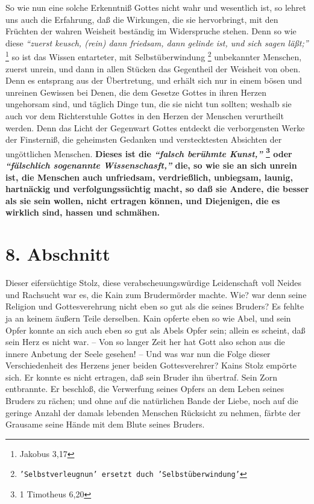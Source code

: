 So wie nun eine solche Erkenntniß Gottes nicht wahr und wesentlich ist, so
lehret uns auch die Erfahrung, daß die Wirkungen, die sie hervorbringt, mit den
Früchten der wahren Weisheit beständig im Widerspruche stehen. Denn so wie diese
\textit{"`zuerst keusch, (rein) dann friedsam, dann gelinde ist, und sich sagen
läßt;"'}
\footnote{Jakobus 3,17}
so ist das Wissen entarteter, mit Selbstüberwindung \footnote{\texttt{'Selbstverleugnun' ersetzt duch 'Selbstüberwindung'}}
unbekannter Menschen, zuerst unrein, und dann in allen Stücken das Gegentheil
der Weisheit von oben. Denn es entsprang aus der Übertretung, und erhält sich
nur in einem bösen und unreinen Gewissen bei Denen, die dem Gesetze Gottes in
ihren Herzen ungehorsam sind, und täglich Dinge tun, die sie nicht tun
sollten; weshalb sie auch vor dem Richterstuhle Gottes in den Herzen der
Menschen verurtheilt werden. Denn das Licht der Gegenwart Gottes entdeckt die
verborgensten Werke der Finsterniß, die geheimsten Gedanken  und verstecktesten
Absichten der ungöttlichen Menschen. \textbf{Dieses ist die
\textit{"`falsch berühmte Kunst,"'}
\footnote{1 Timotheus 6,20}
oder  \textit{"`fälschlich sogenannte Wissenschasft,"'}
die, so wie sie an sich unrein  ist, die Menschen auch unfriedsam, verdrießlich,
unbiegsam, launig, hartnäckig und verfolgungssüchtig macht, so daß sie Andere,
die besser als sie sein wollen, nicht ertragen können, und Diejenigen, die es
wirklich sind, hassen und schmähen.}

\section{8. Abschnitt} \label{kap7_ab8}

Dieser eifersüchtige Stolz, diese verabscheuungswürdige Leidenschaft voll Neides
und Rachsucht war es, die Kain  zum Brudermörder  machte. Wie? war denn seine
Religion und Gottesverehrung nicht eben so gut als die seines Bruders? Es fehlte
ja an keinem äußern Teile derselben. Kain  opferte eben so wie Abel, und sein
Opfer konnte an sich auch eben so gut als Abels Opfer sein; allein es scheint,
daß sein Herz es nicht war. -- Von so langer Zeit her hat Gott also schon aus
die innere Anbetung der Seele gesehen! -- Und was war nun die Folge dieser
Verschiedenheit des Herzens jener beiden Gottesverehrer? Kains Stolz empörte
sich. Er konnte es nicht ertragen, daß sein Bruder ihn übertraf. Sein Zorn
entbrannte. Er beschloß, die Verwerfung seines Opfers an dem Leben seines
Bruders zu rächen; und ohne auf die natürlichen Bande der Liebe, noch auf die
geringe Anzahl der damals lebenden Menschen Rücksicht zu nehmen, färbte der
Grausame seine Hände mit dem Blute seines Bruders.

